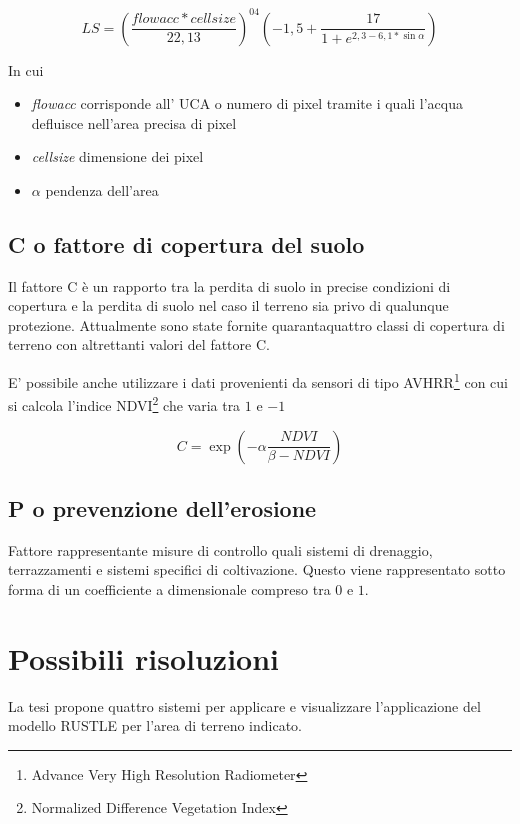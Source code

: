 \begin{equation}\label{eq:ls:edit}
LS=\left( \dfrac{flowacc * cellsize}{22,13}\right)^{04} \left( -1,5+\dfrac{17}{1+ e^{2,3-6,1*\sin{\alpha}}} \right) 
\end{equation}

In cui 
\begin{itemize}
	\item \textit{flowacc} corrisponde all' UCA  o numero di pixel tramite i quali l'acqua defluisce nell'area precisa di pixel
	\item \textit{cellsize} dimensione dei pixel
	\item \textit{$\alpha$} pendenza dell'area
\end{itemize}

\subsection{C o fattore di copertura del suolo}
Il fattore C è un rapporto tra la perdita di suolo in precise condizioni di copertura e la perdita di suolo nel caso il terreno sia privo di qualunque protezione.
Attualmente sono state fornite quarantaquattro classi di copertura di terreno con altrettanti valori del fattore C.

E' possibile anche utilizzare i dati provenienti da sensori di tipo AVHRR\footnote{Advance Very High Resolution Radiometer} con cui si calcola l'indice  NDVI\footnote{Normalized Difference Vegetation Index} che varia tra $1$ e $-1$

\begin{equation}\label{eq:c}
	C=\exp\left( -\alpha \dfrac{NDVI}{\beta -NDVI} \right) 
\end{equation}

\subsection{P o prevenzione dell'erosione}
Fattore rappresentante misure di controllo quali sistemi di drenaggio, terrazzamenti e sistemi specifici di coltivazione. 
Questo viene rappresentato sotto forma di un coefficiente a dimensionale compreso tra $0$ e $1$.

\section{Possibili risoluzioni}
La tesi \cite{tesi:ambientale} propone quattro sistemi per applicare e visualizzare l'applicazione del modello RUSTLE per l'area di terreno indicato.

